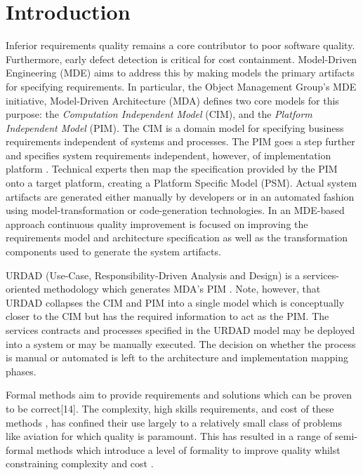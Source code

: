 \section{Introduction}\label{sec:Introduction}

Inferior requirements quality remains a core contributor to poor software quality\cite{heck_experiences_2008,_strategies_2011}. Furthermore, early defect detection is critical for cost containment\cite{betterReferenceThanBoehm1981WhichReliesOnWaterfall}. Model-Driven Engineering (MDE) \cite{frankel_model_2003} aims to address this by making models the primary artifacts for specifying requirements. In particular, the Object Management Group's MDE initiative, Model-Driven Architecture (MDA) defines two core models for this purpose: the \emph{Computation Independent Model} (CIM), and the \emph{Platform Independent Model} (PIM). The CIM is a domain model for specifying business requirements independent of systems and processes. The PIM goes a step further and specifies system requirements independent, however, of implementation platform \cite{needAGoodCitation}. Technical experts then map the specification provided by the PIM onto a target platform, creating a {Platform Specific Model} (PSM).  Actual system artifacts are generated either manually by developers or in an automated fashion using model-transformation or code-generation technologies. In an MDE-based approach continuous quality improvement is focused on improving the requirements model and architecture specification as well as the transformation components used to generate the system artifacts.

URDAD (Use-Case, Responsibility-Driven Analysis and Design) \cite{solms_technology_2007} is a services-oriented methodology which generates MDA's PIM \cite{solms_generating_2009}. Note, however, that URDAD collapses the CIM and PIM into a single model which is conceptually closer to the CIM but has the required information to act as the PIM. The services contracts and processes specified in the URDAD model may be deployed into a system or may be manually executed. The decision on whether the process is manual or automated is left to the architecture and implementation mapping phases. 

Formal methods aim to provide requirements and solutions which can be proven to be correct[14]. The complexity, high skills requirements, and cost of these methods \cite{}, has confined their use largely to a relatively small class of problems like aviation \cite{hall_software_1992} for which quality is paramount. This has resulted in a range of semi-formal methods which introduce a level of formality to improve quality whilst constraining complexity and cost \cite{}.

